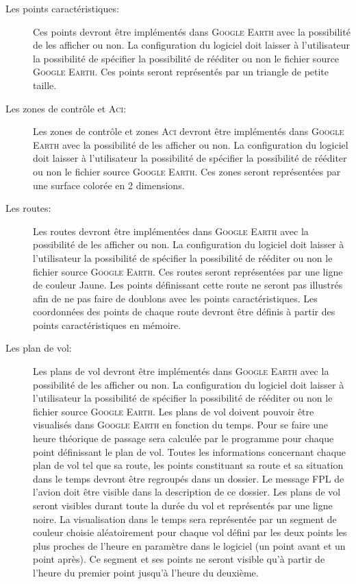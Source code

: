 \begin{description}
    \item[Les points caractéristiques:] Ces points devront être implémentés dans \textsc{Google Earth} avec la possibilité de les afficher ou non. La configuration du logiciel doit laisser à l'utilisateur la possibilité de spécifier la possibilité de rééditer ou non le fichier source \textsc{Google Earth}. Ces points seront représentés par un triangle de petite taille.

    \item[Les zones de contrôle et \textsc{Aci}:] Les zones de contrôle et zones \textsc{Aci} devront être implémentés dans \textsc{Google Earth} avec la possibilité de les afficher ou non. La configuration du logiciel doit laisser à l'utilisateur la possibilité de spécifier la possibilité de rééditer ou non le fichier source \textsc{Google Earth}. Ces zones seront représentées par une surface colorée en 2 dimensions.

    \item[Les routes:] Les routes devront être implémentées dans \textsc{Google Earth} avec la possibilité de les afficher ou non. La configuration du logiciel doit laisser à l'utilisateur la possibilité de spécifier la possibilité de rééditer ou non le fichier source \textsc{Google Earth}. Ces routes seront représentées par une ligne de couleur Jaune. Les points définissant cette route ne seront pas illustrés afin de ne pas faire de doublons avec les points caractéristiques. Les coordonnées des points de chaque route devront être définis à partir des points caractéristiques en mémoire.

    \item[Les plan de vol:] Les plans de vol devront être implémentés dans \textsc{Google Earth} avec la possibilité de les afficher ou non. La configuration du logiciel doit laisser à l'utilisateur la possibilité de spécifier la possibilité de rééditer ou non le fichier source \textsc{Google Earth}. Les plans de vol doivent pouvoir être visualisés dans \textsc{Google Earth} en fonction du temps. Pour se faire une heure théorique de passage sera calculée par le programme pour chaque point définissant le plan de vol. Toutes les informations concernant chaque plan de vol tel que sa route, les points constituant sa route et sa situation dans le temps devront être regroupés dans un dossier. Le message FPL de l'avion doit être visible dans la description de ce dossier. Les plans de vol seront visibles durant toute la durée du vol et représentés par une ligne noire. La visualisation dans le temps sera représentée par un segment de couleur choisie aléatoirement pour chaque vol défini par les deux points les plus proches de l'heure en paramètre dans le logiciel (un point avant et un point après). Ce segment et ses points ne seront visible qu'à partir de l'heure du premier point jusqu'à l'heure du deuxième. 


\end{description}
